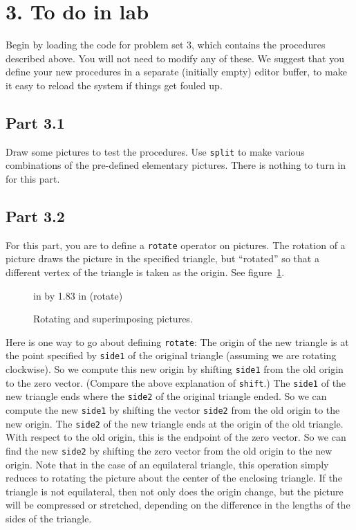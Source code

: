 \section{3. To do in lab}

Begin by loading the code for problem set 3, which contains the
procedures described above.  You will not need to modify any of these.
We suggest that you define your new procedures in a separate
(initially empty) editor buffer, to make it easy to reload the system
if things get fouled up.

\subsection{Part 3.1}

Draw some pictures to test the procedures.  Use {\tt split} to make
various combinations of the pre-defined elementary pictures.  There is
nothing to turn in for this part.

\subsection{Part 3.2}

For this part, you are to define a {\tt rotate} operator on pictures.
The rotation of a picture draws the picture in the specified triangle,
but ``rotated'' so that a different vertex of the triangle is taken as
the origin.  See figure~\ref{rotate}.

\begin{figure}
 in by 1.83 in (rotate)
\caption{{\protect\footnotesize
Rotating and superimposing pictures.}}
\label{rotate}
\end{figure} 

Here is one way to go about defining {\tt rotate}: The origin of the
new triangle is at the point specified by {\tt side1} of the original
triangle (assuming we are rotating clockwise).  So we compute this new
origin by shifting {\tt side1} from the old origin to the zero vector.
(Compare the above explanation of {\tt shift}.)  The {\tt side1} of
the new triangle ends where the {\tt side2} of the original triangle
ended.  So we can compute the new {\tt side1} by shifting the vector
{\tt side2} from the old origin to the new origin.  The {\tt side2} of
the new triangle ends at the origin of the old triangle.  With respect
to the old origin, this is the endpoint of the zero vector.  So we can
find the new {\tt side2} by shifting the zero vector from the old
origin to the new origin.  Note that in the case of an equilateral
triangle, this operation simply reduces to rotating the picture about
the center of the enclosing triangle.  If the triangle is not
equilateral, then not only does the origin change, but the picture
will be compressed or stretched, depending on the difference in the
lengths of the sides of the triangle.

